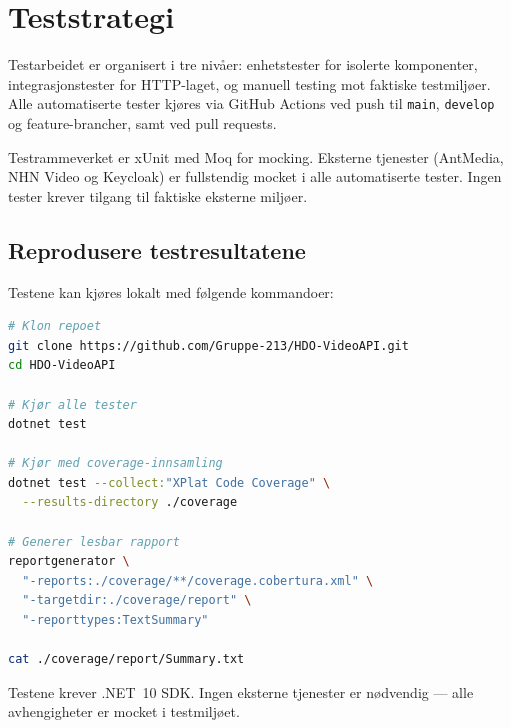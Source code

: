 \section{Teststrategi}
\label{sec:teststrategi}

Testarbeidet er organisert i tre nivåer: enhetstester for 
isolerte komponenter, integrasjonstester for HTTP-laget, 
og manuell testing mot faktiske testmiljøer. Alle automatiserte 
tester kjøres via GitHub Actions ved push til \texttt{main}, 
\texttt{develop} og feature-brancher, samt ved pull requests.

Testrammeverket er xUnit med Moq for mocking. Eksterne 
tjenester (AntMedia, NHN Video og Keycloak) er fullstendig 
mocket i alle automatiserte tester. Ingen tester krever 
tilgang til faktiske eksterne miljøer.

\subsection{Reprodusere testresultatene}
\label{subsec:reprodusere-tester}

Testene kan kjøres lokalt med følgende kommandoer:

\begin{lstlisting}[language=bash, caption={Kjøre testsuiten med coverage}]
# Klon repoet
git clone https://github.com/Gruppe-213/HDO-VideoAPI.git
cd HDO-VideoAPI

# Kjør alle tester
dotnet test

# Kjør med coverage-innsamling
dotnet test --collect:"XPlat Code Coverage" \
  --results-directory ./coverage

# Generer lesbar rapport
reportgenerator \
  "-reports:./coverage/**/coverage.cobertura.xml" \
  "-targetdir:./coverage/report" \
  "-reporttypes:TextSummary"

cat ./coverage/report/Summary.txt
\end{lstlisting}

Testene krever .NET~10 SDK. Ingen eksterne tjenester 
er nødvendig — alle avhengigheter er mocket i 
testmiljøet.